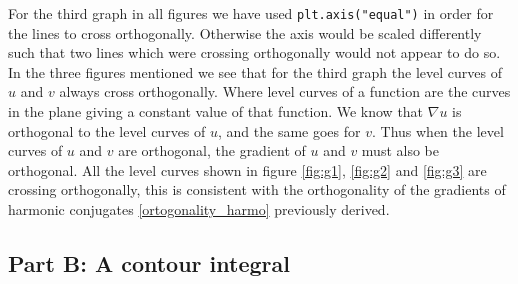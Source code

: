 \documentclass[12pt,twoside]{article}
\begin{document}
For the third graph in all figures we have used \texttt{plt.axis("equal")} in order for the lines to cross orthogonally. Otherwise the axis would be scaled differently such that two lines which were crossing orthogonally would not appear to do so. \\
In the three figures mentioned we see that for the third graph the level curves of $u$ and $v$ always cross orthogonally. Where level curves of a function are the curves in the plane giving a constant value of that function. We know that $\nabla u$ is orthogonal to the level curves of $u$, and the same goes for $v$. Thus when the level curves of $u$ and $v$ are orthogonal, the gradient of $u$ and $v$ must also be orthogonal. All the level curves shown in figure \ref{fig:g1}, \ref{fig:g2} and \ref{fig:g3} are crossing orthogonally, this is consistent with the orthogonality of the gradients of harmonic conjugates \eqref{ortogonality_harmo} previously derived.

\subsection*{Part B: A contour integral}
\end{document}
